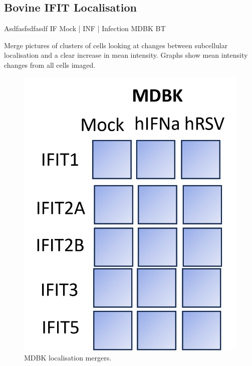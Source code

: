 \subsection{Bovine IFIT Localisation} \label{subsec:Bovine IFIT Localisation}
Asdfasfsdfasdf \newline
IF Mock | INF | Infection \newline
MDBK BT

Merge pictures of clusters of cells looking at changes between subcellular localisation and a clear increase in mean intensity. Graphs show mean intensity changes from all cells imaged.

\begin{figure}
    \centering
    \includegraphics[width=1\linewidth]{07. Chapter 2/Figs/03. Localisation/01. mdbk merges.png}
    \caption[MDBK localisation mergers.]{MDBK localisation mergers.}
    \label{fig:MDBK localisation mergers}
\end{figure}


